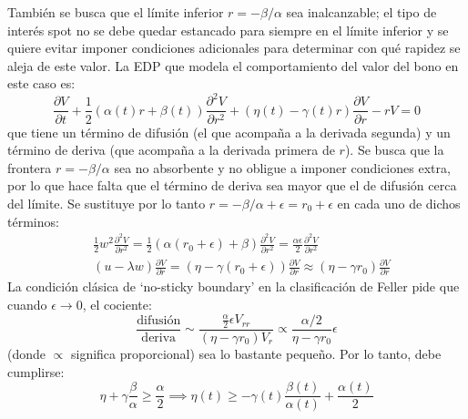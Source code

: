 También se busca que el límite inferior $r=-\beta/\alpha$ sea inalcanzable;  el tipo de interés spot no se debe quedar estancado para siempre en el límite inferior y se quiere evitar imponer condiciones adicionales para determinar con qué rapidez se aleja de este valor. La EDP que modela el comportamiento del valor del bono en este caso es:
\begin{equation*}
    \frac{\partial V}{\partial t} + \frac{1}{2} (\alpha(t) r + \beta(t)) \frac{\partial^2 V}{\partial r^2} + (\eta(t) - \gamma(t) r) \frac{\partial V}{\partial r} - rV = 0
\end{equation*}
que tiene un término de difusión (el que acompaña a la derivada segunda) y un término de deriva (que acompaña a la derivada primera de $r$). Se busca que la frontera $r=-\beta/\alpha$ sea no absorbente y no obligue a imponer condiciones extra, por lo que hace falta que el término de deriva sea mayor que el de difusión cerca del límite. Se sustituye por lo tanto $r=-\beta/\alpha + \epsilon = r_0 + \epsilon$ en cada uno de dichos términos:
\begin{align*}
    &\frac{1}{2} w^2 \frac{\partial^2 V}{\partial r^2} = \frac{1}{2} (\alpha (r_0 + \epsilon) + \beta) \frac{\partial^2 V}{\partial r^2} = \frac{\alpha\epsilon}{2} \frac{\partial^2 V}{\partial r^2} \\
    &(u - \lambda w) \frac{\partial V}{\partial r} = (\eta - \gamma (r_0 + \epsilon)) \frac{\partial V}{\partial r} \approx (\eta - \gamma r_0) \frac{\partial V}{\partial r}
\end{align*}
La condición clásica de `no-sticky boundary' en la clasificación de Feller pide que cuando $\epsilon \to 0$, el cociente:
\begin{equation*}
    \frac{\text{difusión}}{\text{deriva}} \sim \frac{\frac{\alpha}{2} \epsilon V_{rr}}{(\eta - \gamma r_0) V_r} \propto \frac{\alpha/2}{\eta - \gamma r_0} \epsilon
\end{equation*}
(donde $\propto$ significa proporcional) sea lo bastante pequeño. Por lo tanto, debe cumplirse:
\begin{equation*}
    \eta + \gamma \frac{\beta}{\alpha} \geq \frac{\alpha}{2} \implies \boxed{\eta(t) \geq -\gamma(t) \frac{\beta(t)}{\alpha(t)} + \frac{\alpha(t)}{2}}
\end{equation*}

